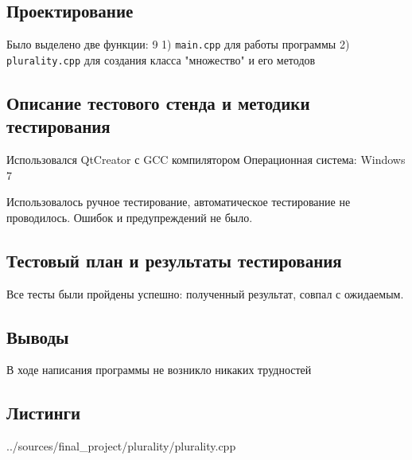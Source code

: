 \documentclass[12pt,a4paper]{report}
\begin{document}
\subsection{Проектирование}

Было выделено две функции:
9
1) \verb-main.cpp- для работы программы
2) \verb-plurality.cpp- для создания класса "множество" и его методов

\subsection{Описание тестового стенда и методики тестирования}
Использовался QtCreator с GCC компилятором
Операционная система: Windows 7


Использовалось ручное тестирование, автоматическое тестирование
не проводилось. Ошибок и предупреждений не было.

\subsection{Тестовый план и результаты тестирования}

Все тесты были пройдены успешно: полученный результат, совпал с ожидаемым.

\subsection{Выводы}

В ходе написания программы не возникло никаких трудностей


\subsection*{Листинги}

{../sources/final_project/plurality/plurality.cpp}
\end{document}
